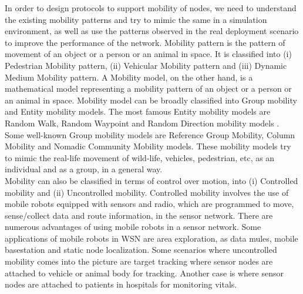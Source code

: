 \documentclass[a4paper, conference, 10pt]{IEEEtran}
\begin{document}
In order to design protocols to support mobility of nodes, we need to understand the existing mobility patterns and try to mimic the same in a simulation environment, as well as use the patterns observed in the real deployment scenario to improve the performance of the network. Mobility pattern is the pattern of movement of an object or a person or an animal in space. It is classified \cite{mobileMACSurvey} into (i) Pedestrian Mobility pattern, (ii) Vehicular Mobility pattern and (iii) Dynamic Medium Mobility pattern. A Mobility model, on the other hand, is a mathematical model representing a mobility pattern of an object or a person or an animal in space. Mobility model can be broadly classified into Group mobility and Entity mobility models. The most famous Entity mobility models are Random Walk, Random Waypoint and Random Direction mobility models \cite{mobModelsSurvey}. Some well-known Group mobility models are Reference Group Mobility, Column Mobility and Nomadic Community Mobility models. These mobility models try to mimic the real-life movement of wild-life, vehicles, pedestrian, etc, as an individual and as a group, in a general way.\\ 

Mobility can also be classified in terms of control over motion, into (i) Controlled mobility and (ii) Uncontrolled mobility. Controlled mobility involves the use of mobile robots equipped with sensors and radio, which are programmed to move, sense/collect data and route information, in the sensor network. There are numerous advantages of using mobile robots in a sensor network. Some applications of mobile robots in WSN are area exploration, as data mules, mobile basestation and static node localization. Some scenarios where uncontrolled mobility comes into the picture are target tracking where sensor nodes are attached to vehicle or animal body for tracking. Another case is where sensor nodes are attached to patients in hospitals for monitoring vitals.\\


\end{document}
